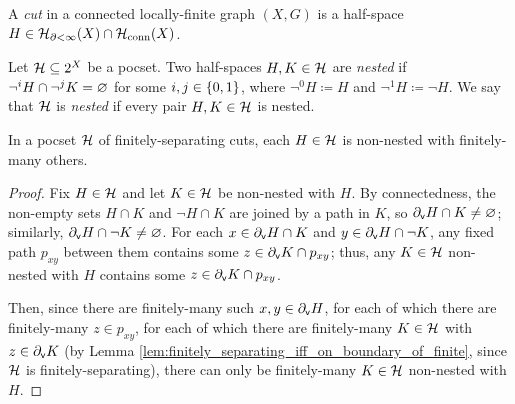 \documentclass[reqno]{amsart}
\begin{document}
    \begin{definition}
        A \textit{cut} in a connected locally-finite graph $(X,G)$ is a half-space $H\in\mc{H}_{\del<\infty}(X)\cap\mc{H}_\mathrm{conn}(X)$.
    \end{definition}

    \begin{definition}\label{def:nested}
        Let $\mc{H}\subseteq2^X$ be a pocset. Two half-spaces $H,K\in\mc{H}$ are \textit{nested} if $\lnot^iH\cap\lnot^jK=\em$ for some $i,j\in\l\{0,1\r\}$, where $\lnot^0H\coloneqq H$ and $\lnot^1H\coloneqq\lnot H$. We say that $\mc{H}$ is \textit{nested} if every pair $H,K\in\mc{H}$ is nested.
    \end{definition}

    \begin{lemma}\label{lem:connected_cuts_non_nested_finitely_others}
        In a pocset $\mc{H}$ of finitely-separating cuts, each $H\in\mc{H}$ is non-nested with finitely-many others.
    \end{lemma}
    \begin{proof}
        Fix $H\in\mc{H}$ and let $K\in\mc{H}$ be non-nested with $H$. By connectedness, the non-empty sets $H\cap K$ and $\lnot H\cap K$ are joined by a path in $K$, so $\del_\mathsf{v}H\cap K\neq\em$; similarly, $\del_\mathsf{v}H\cap\lnot K\neq\em$. For each $x\in\del_\mathsf{v}H\cap K$ and $y\in\del_\mathsf{v}H\cap\lnot K$, any fixed path $p_{xy}$ between them contains some $z\in\del_\mathsf{v}K\cap p_{xy}$; thus, any $K\in\mc{H}$ non-nested with $H$ contains some $z\in\del_\mathsf{v}K\cap p_{xy}$.

        Then, since there are finitely-many such $x,y\in\del_\mathsf{v}H$, for each of which there are finitely-many $z\in p_{xy}$, for each of which there are finitely-many $K\in\mc{H}$ with $z\in\del_\mathsf{v}K$ (by Lemma \ref{lem:finitely_separating_iff_on_boundary_of_finite}, since $\mc{H}$ is finitely-separating), there can only be finitely-many $K\in\mc{H}$ non-nested with $H$.
    \end{proof}

\end{document}
